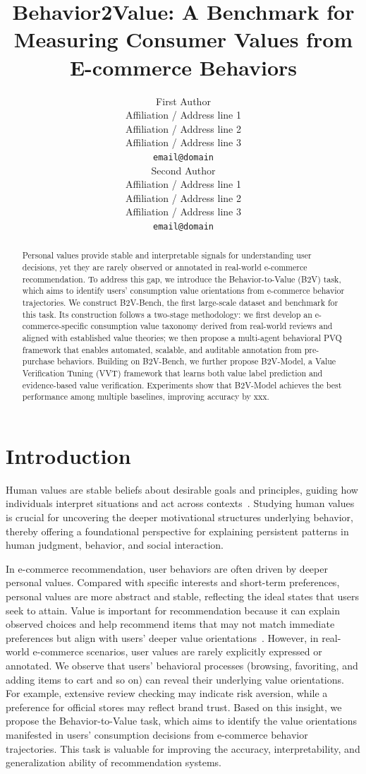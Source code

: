 \documentclass[11pt]{article}
\title{Behavior2Value: A Benchmark for Measuring Consumer Values from E-commerce Behaviors}
\author{First Author \\
  Affiliation / Address line 1 \\
  Affiliation / Address line 2 \\
  Affiliation / Address line 3 \\
  \texttt{email@domain} \\\And
  Second Author \\
  Affiliation / Address line 1 \\
  Affiliation / Address line 2 \\
  Affiliation / Address line 3 \\
  \texttt{email@domain} \\}
\begin{document}
\maketitle
\begin{abstract}
Personal values provide stable and interpretable signals for understanding user decisions, yet they are rarely observed or annotated in real-world e-commerce recommendation. To address this gap, we introduce the Behavior-to-Value (B2V) task, which aims to identify users’ consumption value orientations from e-commerce behavior trajectories. We construct B2V-Bench, the first large-scale dataset and benchmark for this task. Its construction follows a two-stage methodology: we first develop an e-commerce-specific consumption value taxonomy derived from real-world reviews and aligned with established value theories; we then propose a multi-agent behavioral PVQ framework that enables automated, scalable, and auditable annotation from pre-purchase behaviors. Building on B2V-Bench, we further propose B2V-Model, a Value Verification Tuning (VVT) framework that learns both value label prediction and evidence-based value verification. Experiments show that B2V-Model achieves the best performance among multiple baselines, improving accuracy by xxx.
\end{abstract}

\section{Introduction}
Human values are stable beliefs about desirable goals and principles, guiding how individuals interpret situations and act across contexts~\cite{}. Studying human values is crucial for uncovering the deeper motivational structures underlying behavior, thereby offering a foundational perspective for explaining persistent patterns in human judgment, behavior, and social interaction.

In e-commerce recommendation, user behaviors are often driven by deeper personal values. Compared with specific interests and short-term preferences, personal values are more abstract and stable, reflecting the ideal states that users seek to attain. Value is important for recommendation because it can explain observed choices and help recommend items that may not match immediate preferences but align with users’ deeper value orientations~\cite{}. However, in real-world e-commerce scenarios, user values are rarely explicitly expressed or annotated. We observe that users’ behavioral processes (browsing, favoriting, and adding items to cart and so on) can reveal their underlying value orientations. For example, extensive review checking may indicate risk aversion, while a preference for official stores may reflect brand trust. Based on this insight, we propose the Behavior-to-Value task, which aims to identify the value orientations manifested in users’ consumption decisions from e-commerce behavior trajectories. This task is valuable for improving the accuracy, interpretability, and generalization ability of recommendation systems.
\end{document}
